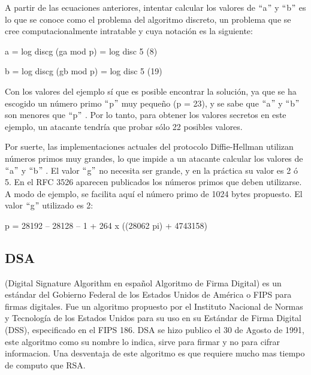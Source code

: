 \documentclass[a4paper]{article}
\begin{document}
\vspace{\baselineskip}
A partir de las ecuaciones anteriores, intentar calcular los valores de $``$a$"$  y $``$b$"$  es lo que se conoce como el problema del algoritmo discreto, un problema que se cree computacionalmente intratable y cuya notación es la siguiente:\par


\vspace{\baselineskip}
a = log discg (ga mod p) = log disc 5 (8)\par

b = log discg (gb mod p) = log disc 5 (19)\par


\vspace{\baselineskip}
Con los valores del ejemplo sí que es posible encontrar la solución, ya que se ha escogido un número primo $``$p$"$  muy pequeño (p = 23), y se sabe que $``$a$"$  y $``$b$"$  son menores que $``$p$"$ . Por lo tanto, para obtener los valores secretos en este ejemplo, un atacante tendría que probar sólo 22 posibles valores.\par


\vspace{\baselineskip}
Por suerte, las implementaciones actuales del protocolo Diffie-Hellman utilizan números primos muy grandes, lo que impide a un atacante calcular los valores de $``$a$"$  y $``$b$"$ . El valor $``$g$"$  no necesita ser grande, y en la práctica su valor es 2 ó 5. En el RFC 3526 aparecen publicados los números primos que deben utilizarse. A modo de ejemplo, se facilita aquí el número primo de 1024 bytes propuesto. El valor $``$g$"$  utilizado es 2:\par


\vspace{\baselineskip}
p = 28192 – 28128 – 1 + 264 x ((28062 pi) + 4743158)\par

\subsection{DSA}
(Digital Signature Algorithm en español Algoritmo de Firma Digital) es un estándar del Gobierno Federal de los Estados Unidos de América o FIPS para firmas digitales. Fue un algoritmo propuesto por el Instituto Nacional de Normas y Tecnología de los Estados Unidos para su uso en su Estándar de Firma Digital (DSS), especificado en el FIPS 186. DSA se hizo publico el 30 de Agosto de 1991, este algoritmo como su nombre lo indica, sirve para firmar y no para cifrar informacion. Una desventaja de este algoritmo es que requiere mucho mas tiempo de computo que RSA.\par
\end{document}
